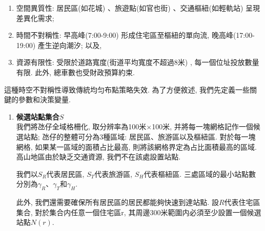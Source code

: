 \begin{enumerate}
    \item 空間異質性: 居民區(如花城) 、旅遊點(如官也街) 、交通樞紐(如輕軌站) 呈現差異化需求; 
    \item 時間不對稱性: 早高峰(7:00-9:00) 形成住宅區至樞紐的單向流, 晚高峰(17:00-19:00) 產生逆向潮汐; 以及, 
    \item 資源有限性: 受限於道路寬度(街道平均寬度不超過8米) , 每一個位址投放數量有限. 此外, 總車數也受財政預算約束. 
\end{enumerate}
這種時空不對稱性導致傳統均匀布點策略失效. 為了方便敘述, 我們先定義一些關鍵的參數和決策變量.  
\begin{enumerate}
    \item \textbf{候選站點集合\(S\)}\\
    我們將氹仔全域格柵化, 取分辨率為100米\(\times\)100米, 并將每一塊網格記作一個候選站點; 氹仔的整體可分為3種區域: 居民區、旅游區以及樞紐區. 對於每一塊網格, 如果某一區域的面積占比最高, 則將該網格界定為占比面積最高的區域. 高山地區由於缺乏交通資源, 我們不在該處設置站點. 

    我們以\(S_R\)代表居民區, \(S_T\)代表旅游區, \(S_H\)代表樞紐區. 三處區域的最小站點數分別為\(\gamma_R\)、\(\gamma_T\)和\(\gamma_H\).

    此外, 我們還需要確保所有居民區的居民都能夠快速到達站點. 設\(R\)代表住宅區集合, 對於集合内任意一個住宅區r, 其周邊300米範圍内必須至少設置一個候選站點\(N(r)\). 


\end{enumerate}
